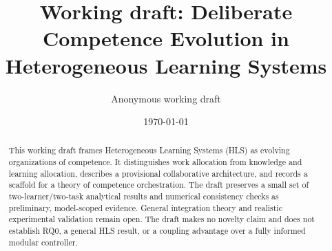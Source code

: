 \documentclass[11pt]{article}
\title{\textbf{Working draft:} Deliberate Competence Evolution in Heterogeneous Learning Systems}
\author{Anonymous working draft}
\date{\today}
\theoremstyle{definition}
\begin{document}
\maketitle

\begin{abstract}
This working draft frames Heterogeneous Learning Systems (HLS) as evolving organizations of competence. It distinguishes work allocation from knowledge and learning allocation, describes a provisional collaborative architecture, and records a scaffold for a theory of competence orchestration. The draft preserves a small set of two-learner/two-task analytical results and numerical consistency checks as preliminary, model-scoped evidence. General integration theory and realistic experimental validation remain open. The draft makes no novelty claim and does not establish RQ0, a general HLS result, or a coupling advantage over a fully informed modular controller.
\end{abstract}














\end{document}
